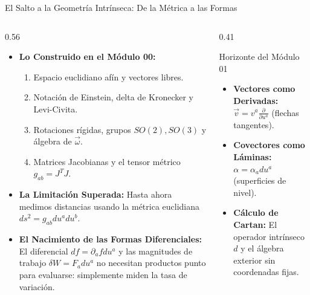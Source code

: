 \documentclass[10pt,aspectratio=169]{beamer}
\begin{document}
\begin{frame}{El Salto a la Geometría Intrínseca: De la Métrica a las Formas}
  \begin{columns}[c]
    \begin{column}{0.56\textwidth}
      \footnotesize
      \begin{itemize}\itemsep2pt
        \item \textbf{Lo Construido en el Módulo 00:}
        \begin{enumerate}\scriptsize\itemsep1pt
          \item Espacio euclidiano afín y vectores libres.
          \item Notación de Einstein, delta de Kronecker y Levi-Civita.
          \item Rotaciones rígidas, grupos $SO(2), SO(3)$ y álgebra de $\vec{\omega}$.
          \item Matrices Jacobianas y el tensor métrico $g_{ab} = J^T J$.
        \end{enumerate}
        \item \textbf{La Limitación Superada:}
        Hasta ahora medimos distancias usando la métrica euclidiana $ds^2 = g_{ab} du^a du^b$.
        \item \textbf{El Nacimiento de las Formas Diferenciales:}
        El diferencial $df = \partial_a f du^a$ y las magnitudes de trabajo $\delta W = F_a du^a$ no necesitan productos punto para evaluarse: simplemente miden la tasa de variación.
      \end{itemize}
    \end{column}
    \begin{column}{0.41\textwidth}
      \footnotesize
      \begin{block}{Horizonte del Módulo 01}
        \scriptsize
        \begin{itemize}\itemsep3pt
          \item \textbf{Vectores como Derivadas:}
          $\vec{v} = v^a \frac{\partial}{\partial u^a}$ (flechas tangentes).
          \item \textbf{Covectores como Láminas:}
          $\alpha = \alpha_a du^a$ (superficies de nivel).
          \item \textbf{Cálculo de Cartan:}
          El operador intrínseco $d$ y el álgebra exterior sin coordenadas fijas.
        \end{itemize}
      \end{block}
    \end{column}
  \end{columns}
\end{frame}
\end{document}
